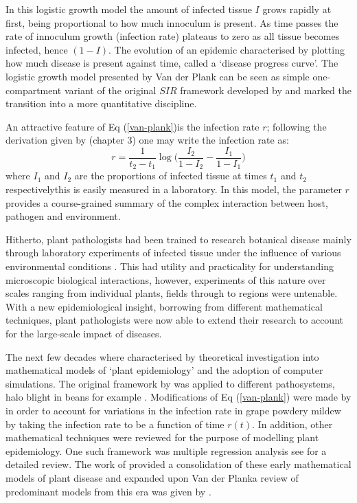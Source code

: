     In this logistic growth model the amount of infected tissue $I$ grows rapidly at first, being proportional to how much innoculum is present. As time passes the rate of innoculum growth (infection rate) plateaus to zero as all tissue becomes infected, hence $(1-I)$. The evolution of an epidemic characterised by plotting how much disease is present against time, called a `disease progress curve'. The logistic growth model presented by Van der Plank can be seen as simple one-compartment variant of the original $SIR$ framework developed by \cite{kermack-model} and marked the transition into a more quantitative discipline.
    
    An attractive feature of Eq (\ref{van-plank})is the infection rate $r$; following the derivation given by \cite{van2013plant} (chapter 3) one may write the infection rate as:
    \begin{equation*}
        r =\frac{1}{t_2 - t_1} \log \Big(\frac{I_2}{1 - I_2} - \frac{I_1}{1 - I_1}\Big)
    \end{equation*}
    where $I_1$ and $I_2$ are the proportions of infected tissue at times $t_1$ and $t_2$ respectively\textemdash this is easily measured in a laboratory. In this model, the parameter $r$ provides a course-grained summary of the complex interaction between host, pathogen and environment. 
    
    Hitherto, plant pathologists had been trained to research botanical disease mainly through laboratory experiments of infected tissue under the influence of various environmental conditions \cite{doi:10.1146/annurev.py.01.090163.000245}. This had utility and practicality for understanding microscopic biological interactions, however, experiments of this nature over scales ranging from individual plants, fields through to regions were untenable. With a new epidemiological insight, borrowing from different mathematical techniques, plant pathologists were now able to extend their research to account for the large-scale impact of diseases. 
    
    The next few decades where characterised by theoretical investigation into mathematical models of `plant epidemiology' and the adoption of computer simulations. The original framework by \cite{van2013plant} was applied to different pathosystems, halo blight in beans for example \cite{doi:10.1111/j.1744-7348.1979.tb06527.x}. Modifications of Eq (\ref{van-plank}) were made by \cite{sall1980epidemiology} in order to account for variations in the infection rate in grape powdery mildew by taking the infection rate to be a function of time $r(t)$. In addition, other mathematical techniques were reviewed for the purpose of modelling plant epidemiology. One such framework was multiple regression analysis see \cite{butt1974multiple} for a detailed review. The work of \cite{zadoks1979epidemiology} provided a consolidation of these early mathematical models of plant disease and expanded upon Van der Plank\textemdash a review of predominant models from this era was given by \cite{jeger1984use}.
    
